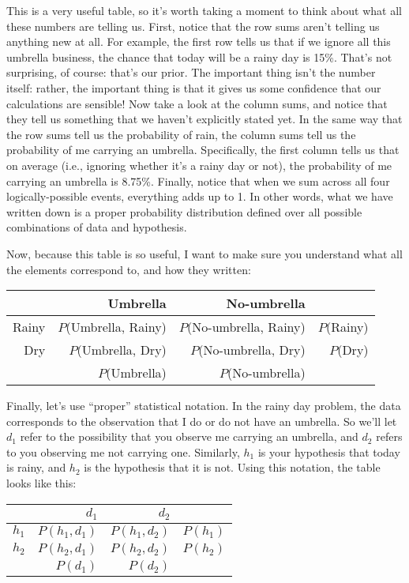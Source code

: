 \noindent
This is a very useful table, so it's worth taking a moment to think about what all these numbers are telling us. First, notice that the row sums aren't telling us anything new at all. For example, the first row tells us that if we ignore all this umbrella business, the chance that today will be a rainy day is 15\%. That's not surprising, of course: that's our prior. The important thing isn't the number itself: rather, the important thing is that it gives us some confidence that our calculations are sensible! Now take a look at the column sums, and notice that they tell us something that we haven't explicitly stated yet. In the same way that the row sums tell us the probability of rain, the column sums tell us the probability of me carrying an umbrella. Specifically, the first column tells us that on average (i.e., ignoring whether it's a rainy day or not), the probability of me carrying an umbrella is 8.75\%. Finally, notice that when we sum across all four logically-possible events, everything adds up to 1. In other words, what we have written down is a proper probability distribution defined over all possible combinations of data and hypothesis.


Now, because this table is so useful, I want to make sure you understand what all the elements correspond to, and how they written:

\begin{center}
\begin{tabular}{r|rr|r}
& Umbrella & No-umbrella &  \\[6pt] \hline
Rainy & $P$(Umbrella, Rainy) & $P$(No-umbrella, Rainy) & $P$(Rainy) \\[6pt]
Dry & $P$(Umbrella, Dry) & $P$(No-umbrella, Dry)  & $P$(Dry) \\[6pt] \hline
 & $P$(Umbrella) & $P$(No-umbrella) & 
\end{tabular}
\end{center}

\noindent
Finally, let's use ``proper'' statistical notation. In the rainy day problem, the data corresponds to the observation that I do or do not have an umbrella. So we'll let $d_1$ refer to the possibility that you observe me carrying an umbrella, and $d_2$ refers to you observing me not carrying one. Similarly, $h_1$ is your hypothesis that today is rainy, and $h_2$ is the hypothesis that it is not. Using this notation, the table looks like this:

 \begin{center}
\begin{tabular}{r|rr|r}
& $d_1$ & $d_2$ &  \\[6pt] \hline
$h_1$ & $P(h_1, d_1)$ & $P(h_1, d_2)$ & $P(h_1)$ \\[6pt]
$h_2$ & $P(h_2, d_1)$ & $P(h_2, d_2)$ & $P(h_2)$ \\[6pt] \hline
 & $P(d_1)$ & $P(d_2)$ & 
\end{tabular}
\end{center}




